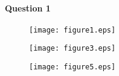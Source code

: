 \paragraph{Question 1} 


\begin{figure}[!h]
\hspace{-.13\linewidth}
	\begin{minipage}[c]{.25\linewidth}
	   \texttt{[image: figure1.eps]}
	\end{minipage}\hspace{.14\linewidth}
	\begin{minipage}[c]{.25\linewidth}
	   \texttt{[image: figure3.eps]}
	\end{minipage}\hspace{.15\linewidth}
	\begin{minipage}[c]{.25\linewidth}
	   \texttt{[image: figure5.eps]}
	\end{minipage}
\end{figure}